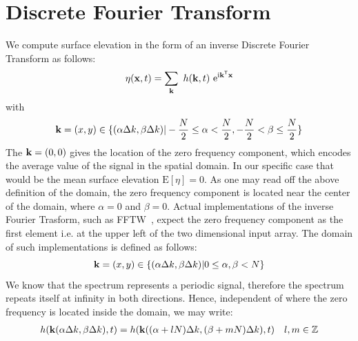 \section{Discrete Fourier Transform}
\label{sec:discrete_fourier_transform}
%
\newcommand{\ccellnum}[2]{\cellcolor{#1}\num{#2}}
\newcommand{\mcleft}[2]{\multicolumn{1}{!{\color{#1}\vline}S}{#2}}
\newcommand{\mcright}[2]{\multicolumn{1}{S !{\color{#1}\vline}}{#2}}
\newcommand{\mcleftright}[2]{\multicolumn{1}{!{\color{#1}\vline} S !{\color{#1}\vline}}{#2}}
%
%
We compute surface elevation in the form of an inverse Discrete Fourier Transform as follows:
\begin{equation}
\label{eq:surface_elevation_h_k_t}
\eta(\mathbf{x}, t) = \sum_{\mathbf{k}}~h(\mathbf{k},t)~\mathrm{e}^{\mathrm{i}\mathbf{k}^{\mathsf{T}}\mathbf{x}}
\end{equation}
with
\begin{equation*}
\mathbf{k} = (x,y)\in\{(\alpha\Delta k,\beta\Delta k)|
-\frac{N}{2}\leq\alpha<\frac{N}{2},-\frac{N}{2}<\beta\leq\frac{N}{2}\}
\end{equation*}
The \wavevector $\mathbf{k} = (0,0)$ gives the location of the zero frequency component,
which encodes the average value of the signal in the spatial domain. In our specific
case that would be the mean surface elevation $\mathrm{E}[\eta] = 0$.
As one may read off the above definition of the \wavevector domain, the zero
frequency component is located near the center of the \wavevector domain,
where $\alpha=0$ and $\beta=0$. Actual implementations of the inverse Fourier Trasform,
such as FFTW~\citep{FFTW05}, expect the zero frequency component as the first element
i.e. at the upper left of the two dimensional input array.
The \wavevector domain of such implementations is defined as follows:
\begin{equation*}
\mathbf{k} = (x,y)\in\{(\alpha\Delta k,\beta\Delta k)|
0\leq\alpha,\beta<N\}
\end{equation*}
%
We know that the spectrum represents a periodic signal, therefore the spectrum
repeats itself at infinity in both directions. Hence, independent of where the
zero frequency is located inside the \wavevector domain, we may write:
%
\begin{align*}
 h(\mathbf{k}(\alpha\Delta k,\beta\Delta k),t) = h(\mathbf{k}((\alpha + lN)\Delta k, (\beta +mN)\Delta k),t) && l,m \in \mathbb{Z}
\end{align*}
